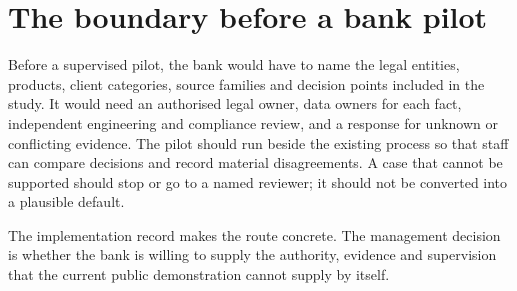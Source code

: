 \section{The boundary before a bank pilot}

Before a supervised pilot, the bank would have to name the legal entities,
products, client categories, source families and decision points included in the
study. It would need an authorised legal owner, data owners for each fact,
independent engineering and compliance review, and a response for unknown or
conflicting evidence. The pilot should run beside the existing process so that
staff can compare decisions and record material disagreements. A case that cannot
be supported should stop or go to a named reviewer; it should not be converted
into a plausible default.

The implementation record makes the route concrete. The management decision is
whether the bank is willing to supply the authority, evidence and supervision
that the current public demonstration cannot supply by itself.
